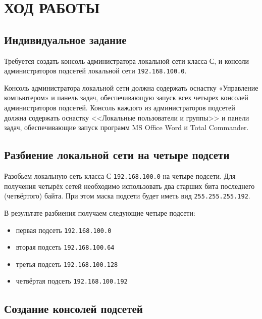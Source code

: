 \section{ХОД РАБОТЫ}
\subsection{Индивидуальное задание}

Требуется создать консоль администратора локальной сети класса С,
и консоли администраторов подсетей локальной сети \texttt{192.168.100.0}.

Консоль администратора локальной сети должна содержать оснастку «Управление компьютером»
и панель задач, обеспечивающую запуск всех четырех консолей администраторов подсетей.
Консоль каждого из администраторов подсетей должна содержать оснастку
<<Локальные пользователи и группы>> и панели задач,
обеспечивающие запуск программ MS Office Word и Total Commander.


\subsection{Разбиение локальной сети на четыре подсети}

Разобьем локальную сеть класса С \texttt{192.168.100.0} на четыре подсети.
Для получения четырёх сетей необходимо использовать два старших бита
последнего (четвёртого) байта. При этом маска подсети будет
иметь вид \texttt{255.255.255.192}.

В результате разбиения получаем следующие четыре подсети:
\begin{itemize}
 \item первая подсеть \texttt{192.168.100.0}
 \item вторая подсеть \texttt{192.168.100.64}
 \item третья подсеть \texttt{192.168.100.128}
 \item четвёртая подсеть \texttt{192.168.100.192}
\end{itemize}


\newpage
\subsection{Создание консолей подсетей}

